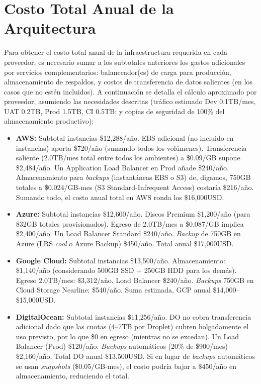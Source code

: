 \documentclass[12pt]{article}
\begin{document}
\section{Costo Total Anual de la Arquitectura}
Para obtener el costo total anual de la infraestructura requerida en cada proveedor, es necesario sumar a los subtotales anteriores los gastos adicionales por servicios complementarios: balanceador(es) de carga para producción, almacenamiento de respaldos, y costos de transferencia de datos salientes (en los casos que no estén incluidos). A continuación se detalla el cálculo aproximado por proveedor, asumiendo las necesidades descritas (tráfico estimado Dev 0.1TB/mes, UAT 0.2TB, Prod 1.5TB, CI 0.5TB; y copias de seguridad de 100\% del almacenamiento productivo):
\begin{itemize}
  \item \textbf{AWS:} Subtotal instancias \$12{,}288/año. EBS adicional (no incluido en instancias) aporta \$720/año (sumando todos los volúmenes). Transferencia saliente (2.0TB/mes total entre todos los ambientes) a \$0.09/GB supone \$2{,}484/año. Un Application Load Balancer en Prod añade \$240/año. Almacenamiento para \textit{backups} (instantáneas EBS o S3) de, digamos, 750GB totales a \$0.024/GB-mes (S3 Standard-Infrequent Access) costaría \$216/año. Sumando todo, el costo anual total en AWS ronda los \$16{,}000USD.
  \item \textbf{Azure:} Subtotal instancias \$12{,}600/año. Discos Premium \$1{,}200/año (para 832GB totales provisionados). Egreso de 2.0TB/mes a \$0.087/GB implica \$2{,}400/año. Un Load Balancer Standard \$240/año. \emph{Backup} de 750GB en Azure (LRS \emph{cool} o Azure Backup) \$450/año. Total anual \$17{,}000USD.
  \item \textbf{Google Cloud:} Subtotal instancias \$13{,}500/año. Almacenamiento: \$1{,}140/año (considerando 500GB SSD + 250GB HDD para los demás). Egreso 2.0TB/mes: \$3{,}312/año. Load Balancer \$240/año. \emph{Backups} 750GB en Cloud Storage Nearline: \$540/año. Suma estimada, GCP anual \$14{,}000--\$15{,}000USD.
  \item \textbf{DigitalOcean:} Subtotal instancias \$11{,}256/año. DO no cobra transferencia adicional dado que las cuotas (4--7TB por Droplet) cubren holgadamente el uso previsto, por lo que \$0 en egreso (mientras no se excedan). Un Load Balancer (Prod) \$120/año. \emph{Backups} automáticos (20\% de \$900/mes) \$2{,}160/año. Total DO anual \$13{,}500USD. Si en lugar de \emph{backups} automáticos se usan \emph{snapshots} (\$0.05/GB-mes), el costo podría bajar a \$450/año en almacenamiento, reduciendo el total.
\end{itemize}
\end{document}

